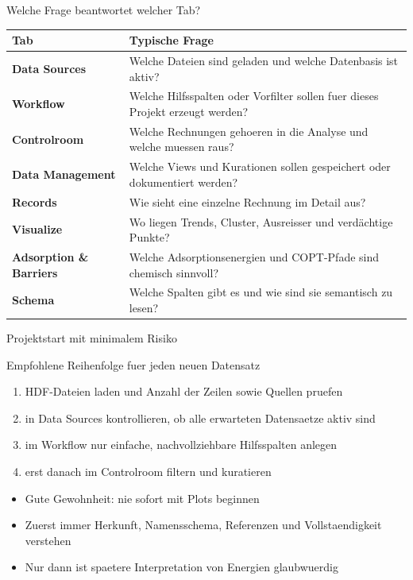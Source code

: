\documentclass[aspectratio=169,10pt]{beamer}
\begin{document}
\begin{frame}{Welche Frage beantwortet welcher Tab?}
  \small
  \begin{tabularx}{\textwidth}{>{\bfseries}lX}
    \toprule
    Tab & Typische Frage \\
    \midrule
    Data Sources & Welche Dateien sind geladen und welche Datenbasis ist aktiv? \\
    Workflow & Welche Hilfsspalten oder Vorfilter sollen fuer dieses Projekt erzeugt werden? \\
    Controlroom & Welche Rechnungen gehoeren in die Analyse und welche muessen raus? \\
    Data Management & Welche Views und Kurationen sollen gespeichert oder dokumentiert werden? \\
    Records & Wie sieht eine einzelne Rechnung im Detail aus? \\
    Visualize & Wo liegen Trends, Cluster, Ausreisser und verd\"achtige Punkte? \\
    Adsorption \& Barriers & Welche Adsorptionsenergien und COPT-Pfade sind chemisch sinnvoll? \\
    Schema & Welche Spalten gibt es und wie sind sie semantisch zu lesen? \\
    \bottomrule
  \end{tabularx}
\end{frame}

\begin{frame}{Projektstart mit minimalem Risiko}
  \begin{block}{Empfohlene Reihenfolge fuer jeden neuen Datensatz}
    \begin{enumerate}
      \item HDF-Dateien laden und Anzahl der Zeilen sowie Quellen pruefen
      \item in Data Sources kontrollieren, ob alle erwarteten Datensaetze aktiv sind
      \item im Workflow nur einfache, nachvollziehbare Hilfsspalten anlegen
      \item erst danach im Controlroom filtern und kuratieren
    \end{enumerate}
  \end{block}

  \vspace{0.3cm}
  \begin{itemize}
    \item Gute Gewohnheit: nie sofort mit Plots beginnen
    \item Zuerst immer Herkunft, Namensschema, Referenzen und Vollstaendigkeit verstehen
    \item Nur dann ist spaetere Interpretation von Energien glaubwuerdig
  \end{itemize}
\end{frame}
\end{document}
